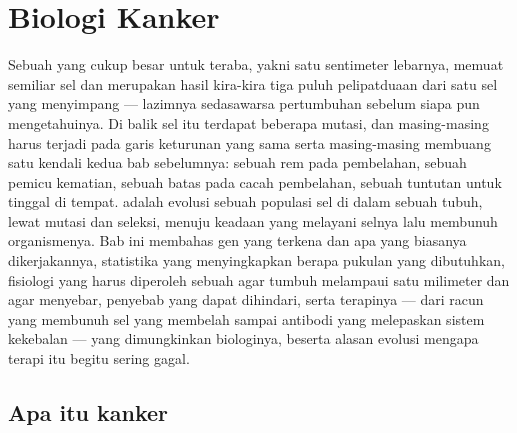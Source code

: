 \chapter{Biologi Kanker}\label{ch:b3:cancer-biology}

Sebuah  yang cukup besar untuk teraba, yakni satu sentimeter lebarnya,
memuat semiliar sel dan merupakan hasil kira-kira tiga puluh pelipatduaan dari
satu sel yang menyimpang --- lazimnya sedasawarsa pertumbuhan sebelum siapa pun
mengetahuinya. Di balik sel itu terdapat beberapa mutasi, dan masing-masing
harus terjadi pada garis keturunan yang sama serta masing-masing membuang satu
kendali kedua bab sebelumnya: sebuah rem pada pembelahan, sebuah pemicu
kematian, sebuah batas pada cacah pembelahan, sebuah tuntutan untuk tinggal di
tempat.  adalah evolusi sebuah populasi sel di dalam sebuah tubuh, lewat
mutasi dan seleksi, menuju keadaan yang melayani selnya lalu membunuh
organismenya. Bab ini membahas gen yang terkena dan apa yang biasanya
dikerjakannya, statistika yang menyingkapkan berapa pukulan yang dibutuhkan,
fisiologi yang harus diperoleh sebuah  agar tumbuh melampaui satu
milimeter dan agar menyebar, penyebab yang dapat dihindari, serta terapinya ---
dari racun yang membunuh sel yang membelah sampai antibodi yang melepaskan
sistem kekebalan --- yang dimungkinkan biologinya, beserta alasan evolusi
mengapa terapi itu begitu sering gagal.

\section{Apa itu kanker}

